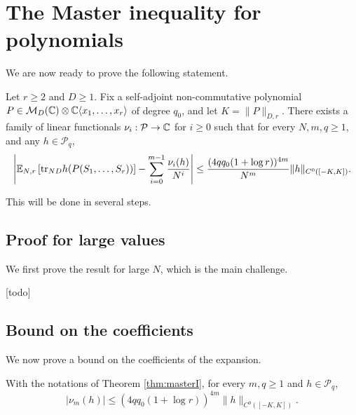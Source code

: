 \section{The Master inequality for polynomials}

We are now ready to prove the following statement.

\begin{theorem}
  \label{thm:masterI}
  \notready
  Let $r \geq 2$ and $D \geq 1$.
  Fix a self-adjoint non-commutative polynomial $P \in \nonco$
  of degree $q_0$, and let $K = \|P\|_{D,r}$.
  There exists a family of linear functionals $\nu_i : \mathcal{P} \rightarrow \C$
  for $i \geq 0$ such that for every $N,m,q \geq 1$, and any $h \in \mathcal{P}_q$,
  \begin{equation*}
    \left|\expec\left[\trN[ND] h(P(S_1, \ldots, S_r))\right]
     - \sum_{i=0}^{m-1} \frac{\nu_i(h)}{N^i}\right|
     \leq \frac{(4 q q_0(1+\log r))^{4m}}{N^m} \|h\|_{C^0([-K,K])}.
  \end{equation*}
\end{theorem}

This will be done in several steps.

\subsection{Proof for large values}

We first prove the result for large $N$, which is the main challenge.

\begin{lemma}
  \label{lem:masterI_largeN}
  [todo]
\end{lemma}

\subsection{Bound on the coefficients}

We now prove a bound on the coefficients of the expansion.

\begin{lemma}
  \label{coro:masterI}
  With the notations of Theorem \ref{thm:masterI},
  for every $m, q \geq 1$ and $h \in \mathcal{P}_q$,
  \begin{equation*}
    |\nu_m(h)|
    \leq (4 q q_0(1+\log r))^{4m} \|h\|_{C^0([-K,K])}.
  \end{equation*}
\end{lemma}

